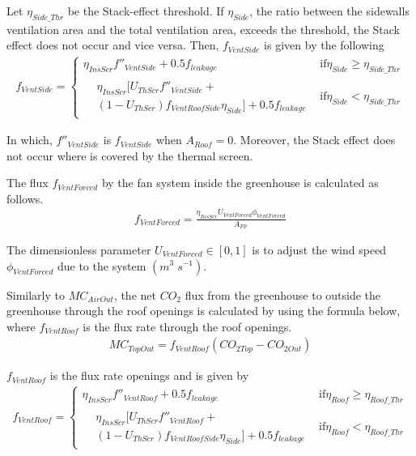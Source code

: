 \documentclass[a4paper]{article}
\numberwithin{equation}{section}
\begin{document}
Let \(\eta_{Side\_Thr}\) be the Stack-effect threshold. If \(\eta_{Side}\), the ratio between the sidewalls ventilation
area and the total ventilation area, exceeds the threshold, the Stack effect does not occur and vice versa. Then, \(f_{VentSide}\) is given by the following
\begin{gather}
  f_{VentSide} =
  \begin{cases}
    \eta_{InsScr} f''_{VentSide} + 0.5f_{leakage} & \text{if} \eta_{Side} \geq \eta_{Side\_Thr} \\
    \begin{split}
      & \eta_{InsScr} [U_{ThScr}f''_{VentSide} + \\
      & (1-U_{ThScr})f_{VentRoofSide} \eta_{Side}] + 0.5 f_{leakage}
    \end{split}                    & \text{if} \eta_{Side} < \eta_{Side\_Thr}
  \end{cases}
\end{gather}

In which,  \(f''_{VentSide}\) is  \(f_{VentSide}\) when \(A_{Roof} = 0\).
Moreover, the Stack effect does not occur where is covered by the thermal screen.

The flux \(f_{VentForced}\) by the fan system inside the greenhouse is calculated as follows.
\begin{gather}
  f_{VentForced} = \frac{\eta_{InsScr} U_{VentForced} \phi_{VentForced} } {A_{Flr}}
\end{gather}

The dimensionless parameter \(U_{VentForced} \in [0,1]\) is to adjust the wind speed \(\phi_{VentForced}\) due to
the system \((m^3\;s^{-1})\).

Similarly to \(MC_{AirOut}\), the net \(CO_2\) flux from the greenhouse to outside the greenhouse through the roof openings is calculated by using the formula below, where \(f_{VentRoof}\) is the flux rate through the roof openings.
\begin{gather}
  MC_{TopOut} = f_{VentRoof}(CO_{2 Top} - CO_{2 Out})
\end{gather}

\(f_{VentRoof}\) is the flux rate openings and is given by
\begin{gather}
  f_{VentRoof} =
  \begin{cases}
    \eta_{InsScr} f''_{VentRoof} + 0.5f_{leakage} & \text{if} \eta_{Roof} \geq \eta_{Roof\_Thr} \\
    \begin{split}
      & \eta_{InsScr} [U_{ThScr}f''_{VentRoof} + \\
      & (1-U_{ThScr})f_{VentRoofSide} \eta_{Side}] + 0.5 f_{leakage}
    \end{split}                    & \text{if}  \eta_{Roof} < \eta_{Roof\_Thr}
  \end{cases}
\end{gather}
\end{document}
